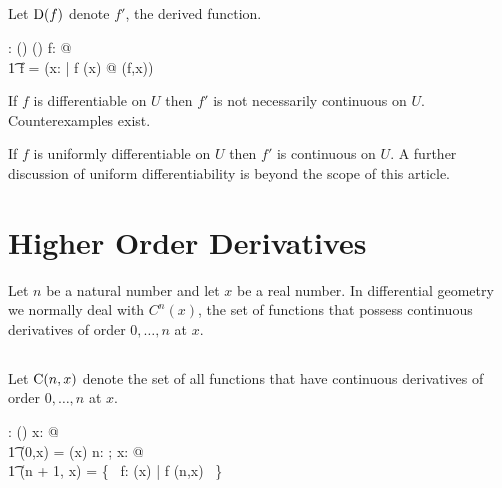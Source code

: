 \documentclass[11pt, oneside]{article}
\begin{document}
\subsection{}

Let $\operatorname{D}(f)$ denote $f'$, the derived function.

\begin{axdef}
	\derivF: (\R \pfun \R) \fun (\R \pfun \R)
\where
	\forall f: \R \pfun \R @ \\
		\t1	\derivF f = (\lambda x: \R | f \in \diffR(x) @ \derivFR(f,x)) 
\end{axdef}

\begin{remark}
If $f$ is differentiable on $U$ then $f'$ is not necessarily continuous on $U$.
Counterexamples exist.
\end{remark}

\begin{remark}
If $f$ is uniformly differentiable on $U$ then $f'$ is continuous on $U$.
A further discussion of uniform differentiability is beyond the scope of this article.
\end{remark}

\section{Higher Order Derivatives}

Let $n$ be a natural number and let $x$ be a real number.
In differential geometry we normally deal with $C^n(x)$, the set of functions
that possess continuous derivatives of order $0, \ldots, n$ at $x$.

\subsection{}

Let $\operatorname{C}(n,x)$ denote the set of all functions that have continuous derivatives of order $0, \ldots, n$ at $x$.

\begin{axdef}
	\CnR: \nat \cross \R \fun \power(\R \pfun \R)
\where
	\forall x: \R @ \\
	\t1	\CnR(0,x) = \CzeroR(x)
\also
	\forall n: \nat; x: \R @ \\
	\t1	\CnR(n + 1, x) = \{~ f: \diffR(x) | \derivF f \in \CnR(n,x) ~\}
\end{axdef}

\subsection{}
\end{document}

